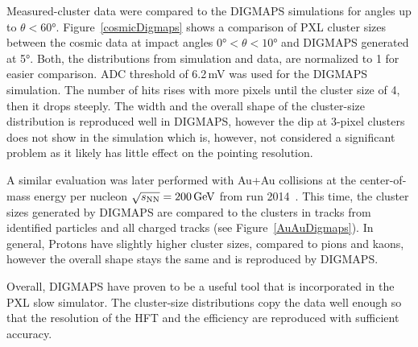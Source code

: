 Measured-cluster data were compared to the DIGMAPS simulations for angles up to $\theta < 60$°. Figure~\ref{cosmicDigmaps} shows a comparison of PXL cluster sizes between the cosmic data at impact angles $0\text{°} < \theta < 10$° and DIGMAPS generated at 5°\@. Both, the distributions from simulation and data, are normalized to 1 for easier comparison.  ADC threshold of 6.2$\,$mV was used for the DIGMAPS simulation. The number of hits rises with more pixels until the cluster size of 4, then it drops steeply. The width and the overall shape of the cluster-size distribution is reproduced well in DIGMAPS, however the dip at 3-pixel clusters does not show in the simulation which is, however, not considered a significant problem as it likely has little effect on the pointing resolution.



A similar evaluation was later performed with Au+Au collisions at the center-of-mass energy per nucleon $\sqrt{s_\text{NN}} = \SI{200}{\giga\electronvolt}$ from run 2014~\cite{KubaVyzkumak}\@. This time, the cluster sizes generated by DIGMAPS are compared to the clusters in tracks from identified particles and all charged tracks (see Figure~\ref{AuAuDigmaps})\@.  In general, Protons have slightly higher cluster sizes, compared to pions and kaons, however the overall shape stays the same and is reproduced by DIGMAPS.

Overall, DIGMAPS have proven to be a useful tool that is incorporated in the PXL slow simulator. The cluster-size distributions copy the data well enough so that the resolution of the HFT and the efficiency are reproduced with sufficient accuracy.

